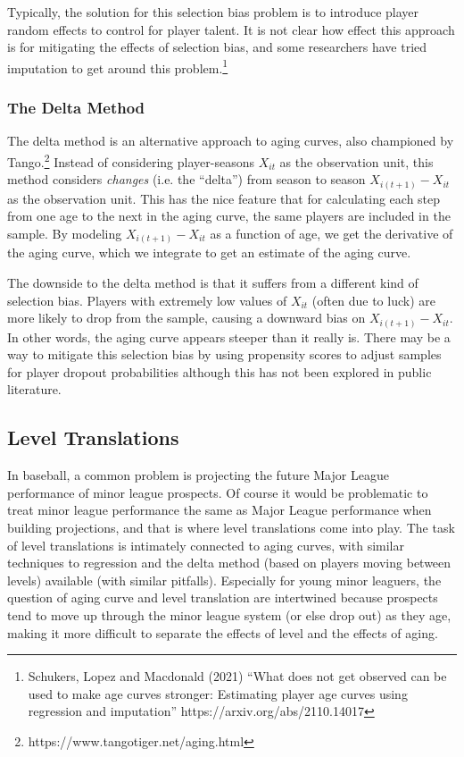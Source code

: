\documentclass{article}
\begin{document}
      Typically, the solution for this selection bias problem is to introduce player random effects to control for player talent. It is not clear how effect this approach is for mitigating the effects of selection bias, and some researchers have tried imputation to get around this problem.\footnote{Schukers, Lopez and Macdonald (2021) ``What does not get observed can be used to make age curves stronger: Estimating player age curves using regression and imputation'' https://arxiv.org/abs/2110.14017}

    \subsubsection{\sc The Delta Method}

      The delta method is an alternative approach to aging curves, also championed by Tango.\footnote{https://www.tangotiger.net/aging.html} Instead of considering player-seasons $X_{it}$ as the observation unit, this method considers {\it changes} (i.e. the ``delta'') from season to season $X_{i(t+1)} - X_{it}$ as the observation unit. This has the nice feature that for calculating each step from one age to the next in the aging curve, the same players are included in the sample. By modeling $X_{i(t+1)} - X_{it}$ as a function of age, we get the derivative of the aging curve, which we integrate to get an estimate of the aging curve.

      The downside to the delta method is that it suffers from a different kind of selection bias. Players with extremely low values of $X_{it}$ (often due to luck) are more likely to drop from the sample, causing a downward bias on $X_{i(t+1)} - X_{it}$. In other words, the aging curve appears steeper than it really is. There may be a way to mitigate this selection bias by using propensity scores to adjust samples for player dropout probabilities although this has not been explored in public literature.

  \subsection{\sc Level Translations}

    In baseball, a common problem is projecting the future Major League performance of minor league prospects. Of course it would be problematic to treat minor league performance the same as Major League performance when building projections, and that is where level translations come into play. The task of level translations is intimately connected to aging curves, with similar techniques to regression and the delta method (based on players moving between levels) available (with similar pitfalls). Especially for young minor leaguers, the question of aging curve and level translation are intertwined because prospects tend to move up through the minor league system (or else drop out) as they age, making it more difficult to separate the effects of level and the effects of aging.
\end{document}

